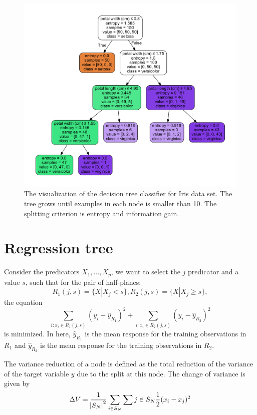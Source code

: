 \begin{refsection}
\begin{figure}[H]
	\centering
	\includegraphics[width=0.7\linewidth]{../figures/statisticalLearning/treeMethods/IrisDecisionTree_minSamplesEntropy}
	\caption{The visualization of the decision tree classifier for Iris data set. The tree grows until examples in each node is smaller than 10. The splitting criterion is entropy and information gain.}
	\label{fig:irisdecisiontreeminsamplesentropy}
\end{figure}



\section{Regression tree}

\begin{definition}
Consider the predicators $X_1,...,X_p$, we want to select the $j$ predicator and a value $s$, such that for the pair of half-planes:
$$R_1(j,s) = \{X|X_j < s\}, R_2(j,s) = \{X|X_j \geq s\},$$
the equation
$$\sum_{i:x_i\in R_1(j,s)} (y_i - \hat{y}_{R_1})^2 + \sum_{i:x_i\in R_2(j,s)} (y_i - \hat{y}_{R_2})^2$$
is minimized. In here, $\hat{y}_{R_1}$ is the mean response for the training observations in $R_1$ and $\hat{y}_{R_2}$ is the mean response for the training observations in $R_2$.
\end{definition}


\begin{remark}
The variance reduction of a node is defined as the total reduction of the variance of the target variable $y$ due to the split at this node. The change of variance is given by
\begin{align*}
\Delta V = \frac{1}{\abs{S_N}^2} \sum_{i \in S_N}\sum{j\in S_N}\frac{1}{2}(x_i-x_j)^2
\end{align*}	
	

\end{remark}
\end{refsection}
